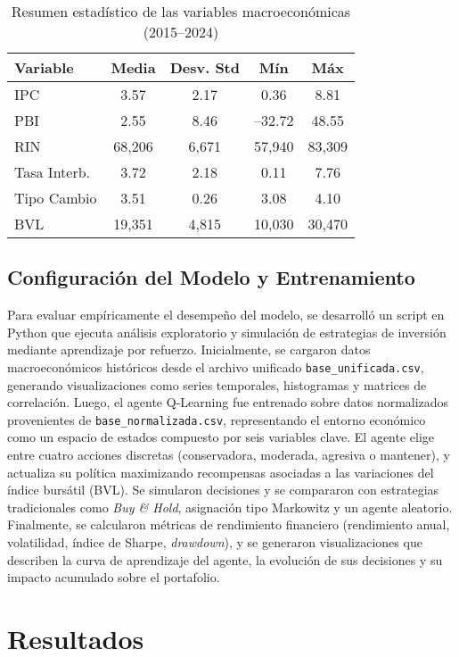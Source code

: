 \documentclass[conference]{IEEEtran}
\begin{document}
	\begin{table}[ht]
		\caption{Resumen estadístico de las variables macroeconómicas (2015–2024)}
		\centering
		\begin{tabular}{lcccc}
			\hline
			\textbf{Variable} & \textbf{Media} & \textbf{Desv. Std} & \textbf{Mín} & \textbf{Máx} \\
			\hline
			IPC & 3.57 & 2.17 & 0.36 & 8.81 \\
			PBI & 2.55 & 8.46 & –32.72 & 48.55 \\
			RIN & 68,206 & 6,671 & 57,940 & 83,309 \\
			Tasa Interb. & 3.72 & 2.18 & 0.11 & 7.76 \\
			Tipo Cambio & 3.51 & 0.26 & 3.08 & 4.10 \\
			BVL & 19,351 & 4,815 & 10,030 & 30,470 \\
			\hline
		\end{tabular}
		\label{tab:stats}
	\end{table}
	
	\subsection{Configuración del Modelo y Entrenamiento}
	
	Para evaluar empíricamente el desempeño del modelo, se desarrolló un script en Python que ejecuta análisis exploratorio y simulación de estrategias de inversión mediante aprendizaje por refuerzo. Inicialmente, se cargaron datos macroeconómicos históricos desde el archivo unificado \texttt{base\_unificada.csv}, generando visualizaciones como series temporales, histogramas y matrices de correlación. Luego, el agente Q-Learning fue entrenado sobre datos normalizados provenientes de \texttt{base\_normalizada.csv}, representando el entorno económico como un espacio de estados compuesto por seis variables clave. El agente elige entre cuatro acciones discretas (conservadora, moderada, agresiva o mantener), y actualiza su política maximizando recompensas asociadas a las variaciones del índice bursátil (BVL). Se simularon decisiones y se compararon con estrategias tradicionales como \textit{Buy \& Hold}, asignación tipo Markowitz y un agente aleatorio. Finalmente, se calcularon métricas de rendimiento financiero (rendimiento anual, volatilidad, índice de Sharpe, \textit{drawdown}), y se generaron visualizaciones que describen la curva de aprendizaje del agente, la evolución de sus decisiones y su impacto acumulado sobre el portafolio.
	
	\section{Resultados}
	
\end{document}
